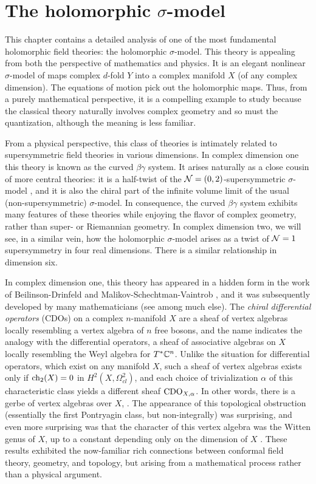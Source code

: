 \chapter{The holomorphic $\sigma$-model}

This chapter contains a detailed analysis of one of the most fundamental holomorphic field theories: the holomorphic $\sigma$-model.
This theory is appealing from both the perspective of mathematics and physics.
It is an elegant nonlinear $\sigma$-model of maps complex $d$-fold $Y$ into a complex manifold $X$ (of any complex dimension). The equations of motion pick out the holomorphic maps. 
Thus, from a purely mathematical perspective, it is a compelling example to study 
because the classical theory naturally involves complex geometry and so must the quantization, although the meaning is less familiar. 

From a physical perspective, this class of theories is intimately related to supersymmetric field theories in various dimensions.
In complex dimension one this theory is known as the curved $\beta\gamma$ system.
It arises naturally as a close cousin of more central theories: it is a half-twist of the $\mathcal N = (0,2)$-supersymmetric $\sigma$-model \cite{WittenCDO}, and it is also the chiral part of the infinite volume limit of the usual (non-supersymmetric) $\sigma$-model. 
In consequence, the curved $\beta\gamma$ system exhibits many features of these theories while enjoying the flavor of complex geometry, rather than super- or Riemannian geometry.
In complex dimension two, we will see, in a similar vein, how the holomorphic $\sigma$-model arises as a twist of $\mathcal N = 1$ supersymmetry in four real dimensions. 
There is a similar relationship in dimension six.

In complex dimension one, this theory has appeared in a hidden form in the work of Beilinson-Drinfeld and Malikov-Schechtman-Vaintrob \cite{BD,MSV}, and it was subsequently developed by many mathematicians (see \cite{KV,Cheung,Bressler} among much else). The {\em chiral differential operators} (CDOs) on a complex $n$-manifold $X$ are a sheaf of vertex algebras locally resembling a vertex algebra of $n$ free bosons, and the name indicates the analogy with the differential operators, a sheaf of associative algebras on $X$ locally resembling the Weyl algebra for $T^*\mathbb C^n$. Unlike the situation for differential operators, which exist on any manifold $X$, such a sheaf of vertex algebras exists only if ${\rm ch}_2(X) = 0$ in $H^2(X, \Omega^2_{cl})$, and each choice of trivialization $\alpha$ of this characteristic class yields a different sheaf ${\rm CDO}_{X,\alpha}$. In other words, there is a gerbe of vertex algebras over $X$, \cite{GMS}. The appearance of this topological obstruction (essentially the first Pontryagin class, but non-integrally) was surprising, and even more surprising was that the character of this vertex algebra was the Witten genus of $X$, up to a constant depending only on the dimension of $X$ \cite{BorLib}. These results exhibited the now-familiar rich connections between conformal field theory, geometry, and topology, but arising from a mathematical process rather than a physical argument. 


